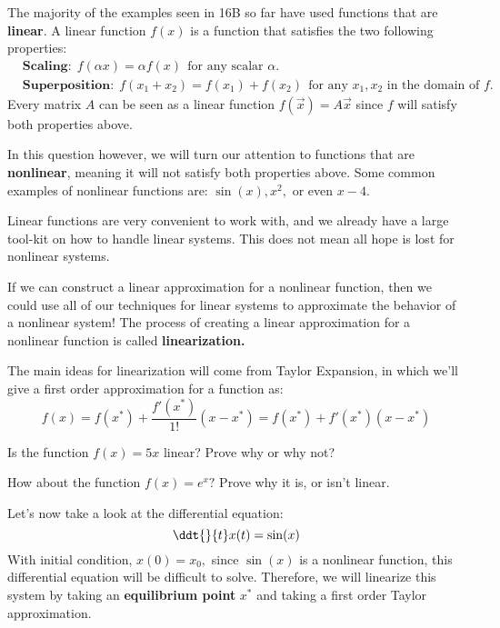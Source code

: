 

The majority of the examples seen in 16B so far have used functions that are \textbf{linear}.
A linear function $f(x)$ is a function that satisfies the two following properties:
\begin{align*}
  &\textbf{Scaling:} \ \ f(\alpha x) = \alpha f(x) \ \ \text{for any scalar $\alpha.$} \\
  &\textbf{Superposition:} \ \ f(x_{1} + x_{2}) = f(x_{1}) + f(x_{2}) \ \ \text{for any $x_{1}, x_{2}$ in the domain of $f.$}
\end{align*}
Every matrix $A$ can be seen as a linear function $f(\vec{x}) = A \vec{x}$ since $f$ will satisfy both properties above.

In this question however, we will turn our attention to functions that are \textbf{nonlinear}, meaning it will not satisfy both properties above. Some common examples of nonlinear functions are: $\sin(x), x^{2},$ or even $x - 4.$

Linear functions are very convenient to work with, and we already have a large tool-kit on how to handle linear systems. 
This does not mean all hope is lost for nonlinear systems.

If we can construct a linear approximation for a nonlinear function, then we could use all of our techniques for linear systems to approximate the behavior of a nonlinear system! 
The process of creating a linear approximation for a nonlinear function is called \textbf{linearization.}

The main ideas for linearization will come from Taylor Expansion, in which we'll give a first order approximation for a function as:
\begin{equation} \label{eqn:ta}
  f(x) = f(x^{*}) + \frac{f'(x^{*})}{1!} (x - x^{*}) = f(x^{*}) + f'(x^{*}) (x - x^{*})
\end{equation}

\begin{enumerate}
  \qitem Is the function $f(x) = 5x$ linear? Prove why or why not?

  \qitem How about the function $f(x) = e^{x}?$ Prove why it is, or isn't linear.
\end{enumerate}

Let's now take a look at the differential equation:
\begin{equation} \label{eqn:nl}
  \ddt{}{t} x(t) = \sin(x)
\end{equation}
With initial condition, $x(0) = x_{0},$ since $\sin(x)$ is a nonlinear function, this differential equation will be difficult to solve.
Therefore, we will linearize this system by taking an \textbf{equilibrium point} $x^{*}$ and taking a first order Taylor approximation.

